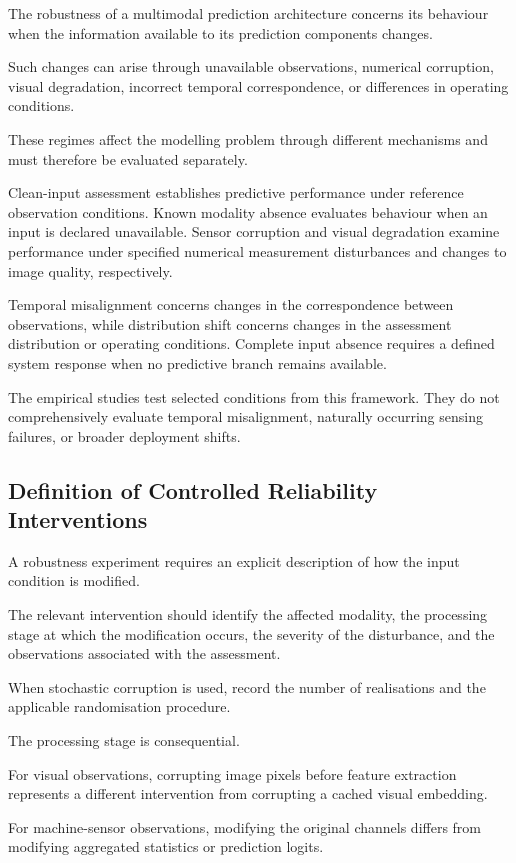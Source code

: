 The robustness of a multimodal prediction architecture concerns its behaviour when the information available to its prediction components changes.

Such changes can arise through unavailable observations, numerical corruption, visual degradation, incorrect temporal correspondence, or differences in operating conditions.

These regimes affect the modelling problem through different mechanisms and must therefore be evaluated separately.

Clean-input assessment establishes predictive performance under reference observation conditions. Known modality absence evaluates behaviour when an input is declared unavailable. Sensor corruption and visual degradation examine performance under specified numerical measurement disturbances and changes to image quality, respectively.

Temporal misalignment concerns changes in the correspondence between observations, while distribution shift concerns changes in the assessment distribution or operating conditions. Complete input absence requires a defined system response when no predictive branch remains available.

The empirical studies test selected conditions from this framework. They do not comprehensively evaluate temporal misalignment, naturally occurring sensing failures, or broader deployment shifts.

\subsection{Definition of Controlled Reliability Interventions}

A robustness experiment requires an explicit description of how the input condition is modified.

The relevant intervention should identify the affected modality, the processing stage at which the modification occurs, the severity of the disturbance, and the observations associated with the assessment.

When stochastic corruption is used, record the number of realisations and the applicable randomisation procedure.

The processing stage is consequential.

For visual observations, corrupting image pixels before feature extraction represents a different intervention from corrupting a cached visual embedding.

For machine-sensor observations, modifying the original channels differs from modifying aggregated statistics or prediction logits.

